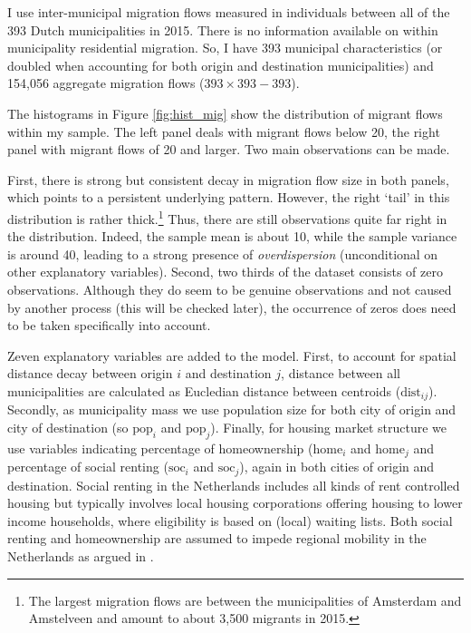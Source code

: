 \documentclass[fleqn,10pt]{SelfArx} %
\begin{document}
        I use inter-municipal migration flows measured in individuals
        between all of the 393 Dutch municipalities in 2015. There
        is no information available on within municipality residential
        migration. So, I have 393 municipal characteristics (or doubled
        when accounting for both origin and destination municipalities)
        and 154,056 aggregate migration flows ($393 \times 393 - 393$).

        The histograms in Figure \ref{fig:hist_mig} show the distribution of migrant
        flows within my sample. The left panel deals with migrant
        flows below 20, the right panel with migrant flows of 20 and
        larger. Two main observations can be made.

        First, there is strong but consistent decay in migration flow size in both panels,
        which points to a persistent underlying pattern. However, the
        right `tail' in this distribution is rather thick.\footnote{The
          largest migration flows are between the municipalities of
          Amsterdam and Amstelveen and amount to about 3,500
          migrants in 2015.} Thus, there are still observations quite far
        right in the distribution. Indeed, the sample mean is about
        10, while the sample variance is around 40, leading to a
        strong presence of \emph{overdispersion} (unconditional on
        other explanatory variables).  Second, two thirds of the
        dataset consists of zero observations. Although they do seem
        to be genuine observations and not caused by another process
        (this will be checked later), the occurrence of zeros does need to be taken
        specifically into account.

        Zeven explanatory variables are added to the model. First, to account for
        spatial distance decay between origin $i$ and destination $j$,
        distance between all municipalities are calculated as
        Eucledian distance between centroids
        ($\text{dist}_{ij}$). Secondly, as municipality mass we use
        population size for both city of origin and city of
        destination (so $\text{pop}_i$ and $\text{pop}_j$). Finally,
        for housing market structure we use variables indicating
        percentage of homeownership ($\text{home}_i$ and
        $\text{home}_j$ and percentage of social renting
        ($\text{soc}_i$ and $\text{soc}_j$), again in both cities of
        origin and destination. Social renting in the Netherlands
        includes all kinds of rent controlled housing but typically
        involves local housing corporations offering housing to lower
        income households, where eligibility is based on (local)
        waiting lists. Both social renting and homeownership are
        assumed to impede regional mobility in the Netherlands as argued in
        \citet{de2009homeownership}.
\end{document}
